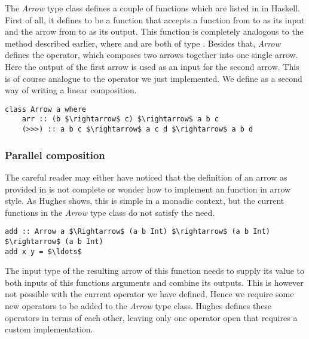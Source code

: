 The \textit{Arrow} type class defines a couple of functions which are listed in  in Haskell. First of all, it defines  to be a function that accepts a function from  to  as its input and the arrow from  to  as its output. This function is completely analogous to the  method described earlier, where  and  are both of type \obs. Besides that, \textit{Arrow} defines the \code{(>>>)} operator, which composes two arrows together into one single arrow. Here the output of the first arrow is used as an input for the second arrow. This is of course analogue to the  operator we just implemented. We define \code{(>>>)} as a second way of writing a linear composition.

\begin{lstlisting}[style=HaskellStyle, caption={\textit{Arrow} type class}, label={lst:arrow-typeclass}]
class Arrow a where
    arr :: (b $\rightarrow$ c) $\rightarrow$ a b c
    (>>>) :: a b c $\rightarrow$ a c d $\rightarrow$ a b d
\end{lstlisting}

\subsubsection{Parallel composition}
The careful reader may either have noticed that the definition of an arrow as provided in  is not complete or wonder how to implement an  function in arrow style. As Hughes shows, this is simple in a monadic context, but the current functions in the \textit{Arrow} type class do not satisfy the need.

\begin{lstlisting}[style=InlineHaskellStyle]
add :: Arrow a $\Rightarrow$ (a b Int) $\rightarrow$ (a b Int) $\rightarrow$ (a b Int)
add x y = $\ldots$
\end{lstlisting}

The input type  of the resulting arrow of this function needs to supply its value to both inputs of this functions arguments and combine its outputs. This is however not possible with the current \code{(>>>)} operator we have defined. Hence we require some new operators to be added to the \textit{Arrow} type class. Hughes defines these operators in terms of each other, leaving only one operator open that requires a custom implementation.

